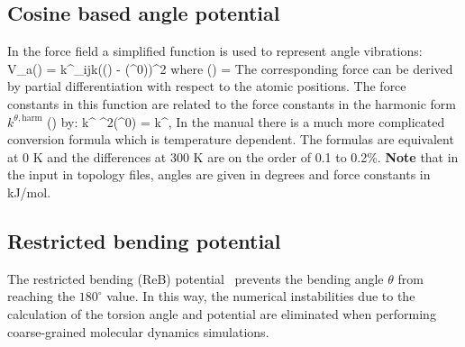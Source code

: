 \subsection{Cosine based angle potential}
\label{subsec:G96angle}
In the  force field a simplified function is used to represent angle
vibrations:
\beq
V_a(\tijk) = \half k^{\theta}_{ijk}\left(\cos(\tijk) - \cos(\tijk^0)\right)^2
\label{eq:G96angle}
\eeq
where 
\beq
\cos(\tijk) = 
\eeq
The corresponding force can be derived by partial differentiation with respect
to the atomic positions. The force constants in this function are related
to the force constants in the harmonic form $k^{\theta,\mathrm{harm}}$
() by:
\beq
k^{\theta} \sin^2(\tijk^0) = k^{\theta,}
\eeq
In the  manual there is a much more complicated conversion formula
which is temperature dependent. The formulas are equivalent at 0 K
and the differences at 300 K are on the order of 0.1 to 0.2\%.
{\bf Note} that in the input in topology files, angles are given in degrees and
force constants in kJ/mol.

\subsection{Restricted bending potential}
\label{subsec:ReB}
The restricted bending (ReB) potential~\cite{MonicaGoga2013} prevents the bending angle $\theta$
from reaching the $180^{\circ}$ value. In this way, the numerical instabilities
due to the calculation of the torsion angle and potential are eliminated when
performing coarse-grained molecular dynamics simulations.

